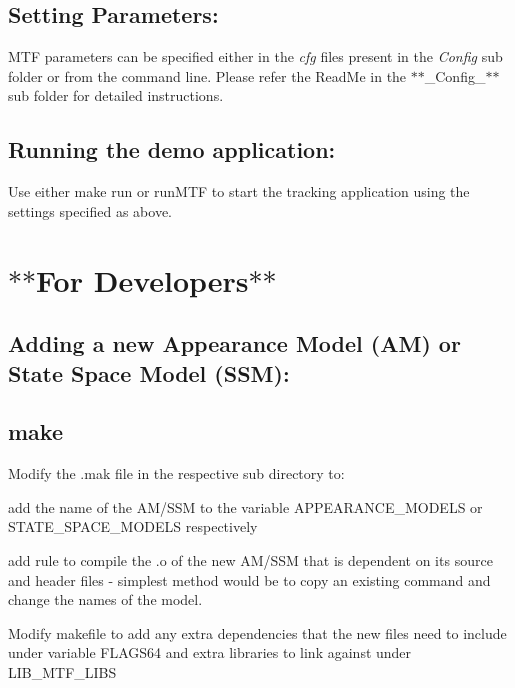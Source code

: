 \subsection*{Setting Parameters\-: }

M\-T\-F parameters can be specified either in the {\itshape cfg} files present in the {\itshape Config} sub folder or from the command line. Please refer the Read\-Me in the $\ast$$\ast$\-\_\-\-Config\-\_\-$\ast$$\ast$ sub folder for detailed instructions.

\subsection*{Running the demo application\-: }

Use either {\ttfamily make run} or {\ttfamily run\-M\-T\-F} to start the tracking application using the settings specified as above.

\section*{$\ast$$\ast$\-For Developers$\ast$$\ast$ }

\subsection*{Adding a new Appearance Model (A\-M) or State Space Model (S\-S\-M)\-: }

\subsection*{make }


\begin{DoxyEnumerate}
\item Modify the .mak file in the respective sub directory to\-:
\begin{DoxyItemize}
\item add the name of the A\-M/\-S\-S\-M to the variable {\ttfamily A\-P\-P\-E\-A\-R\-A\-N\-C\-E\-\_\-\-M\-O\-D\-E\-L\-S} or {\ttfamily S\-T\-A\-T\-E\-\_\-\-S\-P\-A\-C\-E\-\_\-\-M\-O\-D\-E\-L\-S} respectively
\item add rule to compile the .o of the new A\-M/\-S\-S\-M that is dependent on its source and header files -\/ simplest method would be to copy an existing command and change the names of the model.
\end{DoxyItemize}
\item Modify makefile to add any extra dependencies that the new files need to include under variable {\ttfamily F\-L\-A\-G\-S64} and extra libraries to link against under {\ttfamily L\-I\-B\-\_\-\-M\-T\-F\-\_\-\-L\-I\-B\-S}
\end{DoxyEnumerate}

